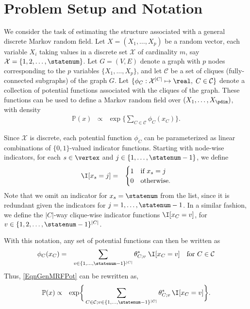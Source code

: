 \def\CliqueSet{\mathcal{C}}
\def\clique{C}

\section{Problem Setup and Notation}

\noindent We consider the task of estimating the structure associated with a general discrete Markov random field. Let $X =
(X_1,\hdots,X_p)$ be a random vector, each variable $X_i$ taking
values in a discrete set $\mathcal{X}$ of cardinality $m$, say $\mathcal{X} =
\{1,2, \ldots, \statenum\}$. Let $G = (V,E)$ denote a graph with $p$ nodes corresponding to the $p$ variables
$\{X_1,\hdots,X_p\}$, and let $\CliqueSet$ be a set of cliques (fully-connected subgraphs)
of the graph $G$. Let $\{ \phi_{\clique} : \mathcal{X}^{|\clique|} \mapsto \real, \; \clique \in \CliqueSet \}$
denote a collection of potential functions associated with the cliques of the graph.
These functions can be used to define a Markov random field over $(X_1, \ldots, X_\pdim)$, with
density
\begin{eqnarray}
\label{EqnGenMRFPot}
\mathbb{P}(x) & \propto & \exp \biggr \{\sum_{\clique \in \CliqueSet} \phi_\clique(x_\clique) \biggr \}.
\end{eqnarray}

\noindent Since $\mathcal{X}$ is discrete, each potential function $\phi_{\clique}$
can be parameterized as linear combinations of $\{0,1\}$-valued indicator functions.  
Starting with node-wise indicators, for each $s \in \vertex$ and $j
\in \{1, \ldots, \statenum-1\}$, we define
\begin{eqnarray*}
\I[x_{s} = j] & = & \begin{cases} 1 & \mbox{if $x_s =j$} \\ 
											0 & \mbox{otherwise.}
                    \end{cases}
\end{eqnarray*}
Note that we omit an indicator for $x_s = \statenum$ from the list, since
it is redundant given the indicators for $j = 1, \ldots, \statenum-1$.
In a similar fashion, we define the $|\clique|$-way clique-wise indicator functions 
$\I[x_\clique = v]$, for $v \in \{1,2,\ldots, \statenum - 1\}^{|\clique|}$.

\noindent With this notation, any set of potential functions can then be written as
\begin{eqnarray*}
\phi_{\clique}(x_\clique) & = & \sum_{v \in \{1, \ldots, \statenum-1 \}^{|\clique|}}
	\theta^*_{\clique;v} \; \I[x_\clique = v] \quad \mbox{for $\clique \in \CliqueSet$}
\end{eqnarray*}
Thus, \eqref{EqnGenMRFPot} can be rewritten as,
\begin{align}
\label{EqnGenMRF}
\mathbb{P}(x) & \propto & \exp \biggr \{\sum_{\clique \in \CliqueSet; v \in \{1, \ldots, \statenum-1 \}^{|\clique|}} \theta^*_{\clique;v} \, \I[x_\clique = v] \biggr \}.
\end{align}

